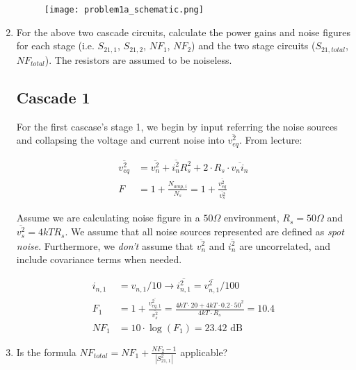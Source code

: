 \begin{enumerate}[label=(\alph*)]
    \begin{figure}[H]
        \centering \texttt{[image: problem1a\_schematic.png]}
    \end{figure}

    \item {\color{blue}For the above two cascade circuits, calculate the power gains and noise figures for each stage (i.e. $S_{21,1}$, $S_{21,2}$, $NF_1$, $NF_2$) and the two stage circuits ($S_{21,total}$, $NF_{total}$).
    The resistors are assumed to be noiseless.}

    \subsection{Cascade 1}

    For the first cascase's stage 1, we begin by input referring the noise sources and collapsing the voltage and current noise into $\overline{v_{eq}^2}$.
    From lecture:

    \begin{align*}
        \overline{v_{eq}^2} &= \overline{v_n^2} + \overline{i_n^2} R_s^2 + 2 \cdot R_s \cdot \overline{v_n i_n} \\
        F &= 1 + \frac{N_{amp,i}}{N_s} = 1 + \frac{\overline{v_{eq}^2}}{\overline{v_s^2}}
    \end{align*}

    Assume we are calculating noise figure in a $50 \Omega$ environment, $R_s = 50 \Omega$ and $\overline{v_s^2} = 4 kT R_s$.
    We assume that all noise sources represented are defined as \emph{spot noise}.
    Furthermore, we \emph{don't} assume that $\overline{v_n^2}$ and $\overline{i_n^2}$ are uncorrelated, and include covariance terms when needed.

    \begin{align*}
        i_{n,1} &= v_{n,1} / 10 \rightarrow \overline{i_{n,1}^2} = \overline{v_{n,1}^2} / 100 \\
        F_1 &= 1 + \frac{\overline{v_{eq,1}^2}}{\overline{v_s^2}} = \frac{4kT\cdot 20 + 4kT \cdot 0.2 \cdot 50^2}{4kT \cdot R_s} = 10.4 \\
        NF_1 &= 10 \cdot \log(F_1) = 23.42 \text{ dB}
    \end{align*}

    \item {\color{blue} Is the formula $NF_{total} = NF_1 + \frac{NF_2-1}{|S_{21,1}^2|}$ applicable?}


\end{enumerate}
